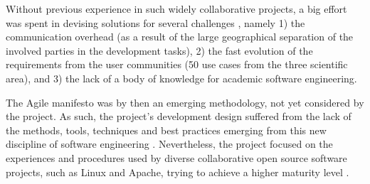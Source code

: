 Without previous experience in such widely
collaborative projects, a big effort was spent in devising solutions for several
challenges \cite{datagrid}, namely 1) the communication overhead (as a
result of the large geographical separation of the involved parties in the
development tasks), 2) the fast evolution of the requirements from the user
communities (50 use cases from the three scientific area), and 3) the lack of a body
of knowledge for academic software engineering.

The Agile manifesto \cite{agile-manifesto} was by then an emerging methodology, not yet
considered by the project. As such, the project's
development design suffered from the lack of the methods, tools, techniques and best
practices emerging from this new discipline of software engineering
\cite{agile}. Nevertheless, the project focused on the experiences and procedures
used by diverse collaborative open source software projects, such as Linux and Apache, trying to
achieve a higher maturity level \cite{cmm}.

